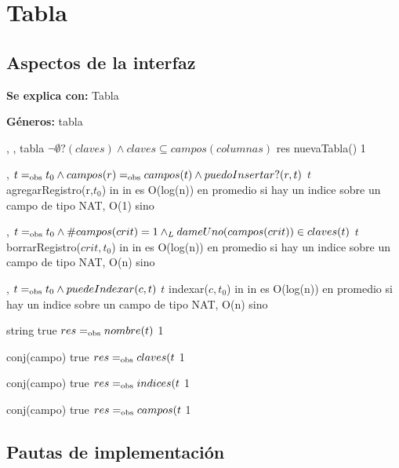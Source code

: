 \section{Tabla}

\subsection{Aspectos de la interfaz}

\textbf{Se explica con:} Tabla

\textbf{Géneros:} tabla

{   ,
    ,
    } %
{tabla} %
{$\neg\emptyset?(claves) \land claves \subseteq campos(columnas)$} %
{res \igobs nuevaTabla()} %
{1} %
{} %
{} %

{   ,
    }
{}
{$t =_{\mathrm{obs}} t_0 \land campos(r) =_{\mathrm{obs}} campos(t) \land puedoInsertar?(r,t)$}
{$t$ \igobs agregarRegistro(r,$t_0$)}
{in}
{}
{in es O(log(n)) en promedio si hay un indice sobre un campo de tipo NAT, O(1) sino}

{   ,
    }
{}
{$t =_{\mathrm{obs}} t_0 \land \#campos(crit) = 1 \land_L dameUno(campos(crit)) \in claves(t)$}
{$t$ \igobs borrarRegistro($crit,t_0$)}
{in}
{}
{in es O(log(n)) en promedio si hay un indice sobre un campo de tipo NAT, O(n) sino}

{   ,
    }
{}
{$t =_{\mathrm{obs}} t_0 \land puedeIndexar(c,t)$}
{$t$ \igobs indexar($c,t_0$)}
{in}
{}
{in es O(log(n)) en promedio si hay un indice sobre un campo de tipo NAT, O(n) sino}

{   }
{string}
{true}
{$res =_{\mathrm{obs}} nombre(t)$}
{1}
{}
{}

{   }
{conj(campo)}
{true}
{$res =_{\mathrm{obs}} claves(t$}
{1}
{}
{}

{   }
{conj(campo)}
{true}
{$res =_{\mathrm{obs}} indices(t$}
{1}
{}
{}

{   }
{conj(campo)}
{true}
{$res =_{\mathrm{obs}} campos(t$}
{1}
{}
{}

\subsection{Pautas de implementación}


